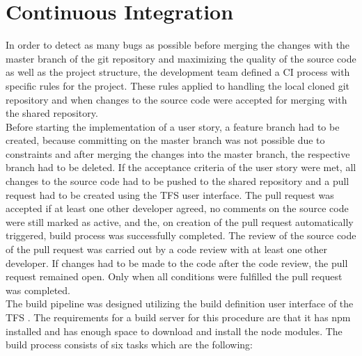 \documentclass[Bachelor,BIF,english]{twbook}
\begin{document}
\section{Continuous Integration}
In order to detect as many bugs as possible before merging the changes with the master branch of the git \cite{Git} repository and maximizing the quality of the source code as well as the project structure, the development team defined a CI process with specific rules for the project. These rules applied to handling the local cloned git repository and when changes to the source code were accepted for merging with the shared repository. 
\\[\baselineskip]
Before starting the implementation of a user story, a feature branch had to be created, because committing on the master branch was not possible due to constraints and after merging the changes into the master branch, the respective branch had to be deleted. If the acceptance criteria of the user story were met, all changes to the source code had to be pushed to the shared repository and a pull request had to be created using the TFS user interface. The pull request was accepted if at least one other developer agreed, no comments on the source code were still marked as active, and the, on creation of the pull request automatically triggered, build process was successfully completed. The review of the source code of the pull request was carried out by a code review with at least one other developer. If changes had to be made to the code after the code review, the pull request remained open. Only when all conditions were fulfilled the pull request was completed.
\\[\baselineskip]
The build pipeline was designed utilizing the build definition user interface of the TFS \cite{TFSBuildPipeline} . The requirements for a build server for this procedure are that it has npm installed and has enough space to download and install the node modules. The build process consists of six tasks which are the following:
\end{document}
